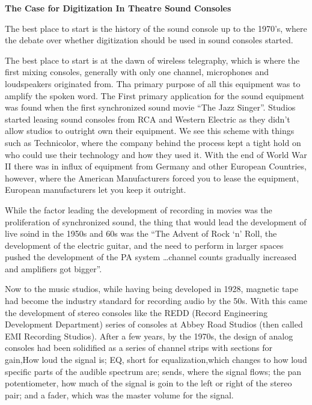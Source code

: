 \documentclass[12pt]{article}
\begin{document}
\begin{doublespace}
\vspace*{20pt}
\begin{center} \textbf{The Case for Digitization In Theatre Sound Consoles} \end{center}
    \par The best place to start is the history of the sound console up to the 1970's, where the debate over whether digitization should be used in sound consoles started.
    \par The best place to start is at the dawn of wireless telegraphy, which is where the first mixing consoles, generally with only one channel, microphones and loudspeakers originated from. Tha primary purpose of all this equipment was to amplify the spoken word.\autocite{coulesMixingEvolutionKey2020}
    The First primary application for the sound equipment was found when the first synchronized sound movie ``The Jazz Singer''. Studios started leasing sound consoles from RCA and Western Electric as they didn't allow studios to outright own their equipment.\autocite{guitarcenterEvolutionRecordingMixing} We see this scheme with things such as Technicolor, where the company behind the process kept a tight hold on who could use their technology and how they used it.
    With the end of World War II there was in influx of equipment from Germany and other European Countries, however, where the American Manufacturers forced you to lease the equipment, European manufacturers let you keep it outright.\autocite{guitarcenterEvolutionRecordingMixing}
    \par While the factor leading the development of recording in movies was the proliferation of synchronized sound, the thing that would lead the development of live soind in the 1950s and 60s was the ``The Advent of Rock `n' Roll, the development of the electric guitar, and the need to perform in larger spaces pushed the development of the PA system \dots channel counts gradually increased and amplifiers got bigger''.\autocite{coulesMixingEvolutionKey2020}
    \par Now to the music studios, while having being developed in 1928, magnetic tape had become the industry standard for recording audio by the 50s. With this came the development of stereo consoles like the REDD (Record Engineering Development Department) series of consoles at Abbey Road Studios (then called EMI Recording Studios).\autocite{HistoryStudioConsole2023}
    After a few years, by the 1970s, the design of analog consoles had been solidified as a series of channel strips with sections for gain,How loud the signal is; EQ, short for equalization,which  changes to how loud specific parts of the audible spectrum are; sends, where the signal flows; the pan potentiometer, how much of the signal is goin to the left or right of the stereo pair; and a fader, which was the master volume for the signal.

\end{doublespace}
\end{document}

